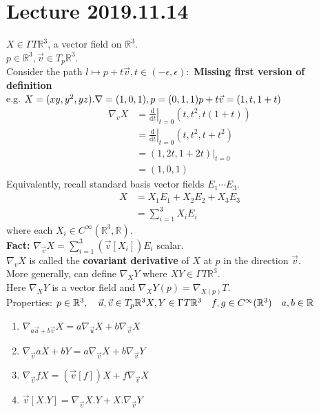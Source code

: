 \documentclass{article}
\let\ddd\cdots
\renewcommand{\d}{\mathrm{d}}
\newcommand{\R}{\mathbb{R}}
\newcommand{\dv}[2]{\frac{\d #1}{\d #2}}
\newcommand{\fdv}[3]{\left.\dv{#1}{#2}\right|_{#3}}
\theoremstyle{definition}
\theoremstyle{remark}
\theoremstyle{example}
\begin{document}
	\section*{Lecture 2019.11.14}
	$X \in \Gamma T \R^3$, a vector field on $\R^3$.\\
	$p \in \R^3, \vec{v} \in T_p \R^3$.\\
	Consider the path $l \mapsto p + t \vec{v}, t \in \left(-\epsilon, \epsilon\right):$
	\textbf{Missing first version of definition}\\
	e.g. $X=(xy,y^2,yz).\\
	\nabla=(1,0,1), p=(0,1,1)\\
	p+t \vec{v}=(1,t,1+t)$
	\begin{align*}
		\nabla_vX&=\fdv{}{t}{t=0} \left(t,t^2,t(1+t)\right)\\
		&=\fdv{}{t}{t=0}\left(t,t^2,t+t^2\right)\\
		&=(1,2t,1+2t)|_{t=0}\\
		&=(1,0,1)
	\end{align*}
	Equivalently, recall standard basis vector fields $E_1 \ddd E_3$.\\
	\begin{align*}
		X&=X_1E_1+X_2E_2+X_3E_3\\
		&=\sum_{i=1}^{3}X_iE_i
	\end{align*}
	where each $X_i \in C^\infty(\R^3,\R)$.\\
	\textbf{Fact: } $\nabla_{\vec{v}} X = \sum_{i=1}^{3}(\vec{v}[X_i])E_i$ scalar.\\
	$\nabla_vX$ is called the \textbf{covariant derivative} of $X$ at $p$ in the direction $\vec{v}$.\\
	More generally, can define $\nabla_XY$ where $XY \in \Gamma T \R^3$.\\
	Here $\nabla_XY$ is a vector field and $\nabla_XY(p)=\nabla_{X(p)}T$.\\
	Properties: $p \in \R^3,\quad \vec{u}, \vec{v} \in T_p \R^3\\
	X,Y \in \Gamma T \R^3\quad f,g \in C^\infty(\R^3) \quad a,b \in \R$
	\begin{enumerate}
		\item $\nabla_{a\vec{u}+b \vec{v}}X=a \nabla_{\vec{u}}X+b\nabla_{\vec{v}}X$
		\item $\nabla_{\vec{v}}aX+bY=a\nabla_{\vec{v}}X+b\nabla_{\vec{v}}Y$
		\item $\nabla_{\vec{v}}fX=(\vec{v}[f])X+f\nabla_{\vec{v}}X$
		\item $\vec{v}[X.Y]=\nabla_{\vec{v}}X.Y+X.\nabla_{\vec{v}}Y$
	\end{enumerate}
\end{document}
